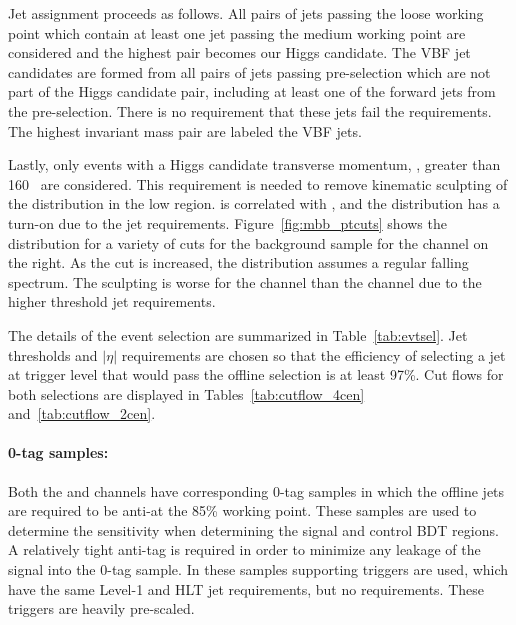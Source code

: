 Jet assignment proceeds as follows.  All pairs of \btagged jets passing the loose working point which contain at least one jet passing the medium working point are considered and the highest \pT pair becomes our Higgs candidate.  The VBF jet candidates are formed from all pairs of jets passing pre-selection which are not part of the Higgs candidate pair,  including at least one of the forward jets from the pre-selection.  There is no requirement that these jets fail  the \btagging requirements. The highest invariant mass pair are labeled the VBF jets. 

Lastly, only events with a Higgs candidate transverse momentum, \pTbb, %
greater than 160 \GeV~are considered.  This requirement is needed to remove kinematic sculpting of the \Mbb{} distribution in the low \Mbb{} region.  \Mbb{} is correlated with \pTbb{}, and the \pTbb{} distribution has a turn-on due to the jet \pT requirements. Figure~\ref{fig:mbb_ptcuts} shows the \Mbb distribution for a variety of \pTbb cuts for the background sample for the \twocentral channel on the right.  As the \pTbb{} cut is increased, the distribution assumes a regular falling spectrum.  The sculpting is worse for the \twocentral channel than the \fourcentral channel due to the higher threshold jet requirements. 


The details of the event selection are summarized in Table~\ref{tab:evtsel}. 
Jet \pT thresholds and $|\eta|$ requirements are chosen so that the efficiency of selecting a jet at trigger level that would pass the offline selection is at least 97\%. Cut flows for both selections are displayed in Tables~\ref{tab:cutflow_4cen} and~\ref{tab:cutflow_2cen}.


\paragraph{0-tag samples:} Both the \fourcentral and \twocentral channels have corresponding 0-tag samples in which the offline jets are required to be anti-\btagged at the 85\% working point. These samples are used to determine the sensitivity when determining the signal and control BDT regions.   A relatively tight anti-tag is required in order to minimize any leakage of the signal into the 0-tag sample.  In these samples supporting triggers are used, which have the same Level-1 and HLT jet requirements, but no \btagging requirements.  These triggers are heavily pre-scaled.  


